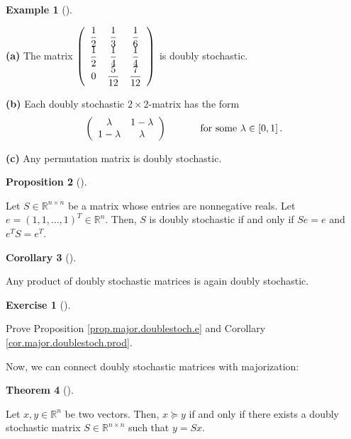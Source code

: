 \documentclass[numbers=enddot,12pt,final,onecolumn,notitlepage]{scrartcl}%
\newcounter{exer}
\numberwithin{exer}{subsection}
\theoremstyle{definition}
\newtheorem{theo}{Theorem}[subsection]
\newenvironment{theorem}[1][]
{\begin{theo}[#1]\begin{leftbar}}
{\end{leftbar}\end{theo}}
\newtheorem{prop}[theo]{Proposition}
\newenvironment{proposition}[1][]
{\begin{prop}[#1]\begin{leftbar}}
{\end{leftbar}\end{prop}}
\newtheorem{coro}[theo]{Corollary}
\newenvironment{corollary}[1][]
{\begin{coro}[#1]\begin{leftbar}}
{\end{leftbar}\end{coro}}
\newtheorem{exam}[theo]{Example}
\newenvironment{example}[1][]
{\begin{exam}[#1]\begin{leftbar}}
{\end{leftbar}\end{exam}}
\newtheorem{exmp}[exer]{Exercise}
\newenvironment{exercise}[1][]
{\begin{exmp}[#1]\begin{leftbar}}
{\end{leftbar}\end{exmp}}
\begin{document}
\begin{example}
\label{exa.major.doublestoch.exas}\textbf{(a)} The matrix $\left(
\begin{array}
[c]{ccc}%
\dfrac{1}{2} & \dfrac{1}{3} & \dfrac{1}{6}\\
\dfrac{1}{2} & \dfrac{1}{4} & \dfrac{1}{4}\\
0 & \dfrac{5}{12} & \dfrac{7}{12}%
\end{array}
\right)  $ is doubly stochastic. \medskip

\textbf{(b)} Each doubly stochastic $2\times2$-matrix has the form%
\[
\left(
\begin{array}
[c]{cc}%
\lambda & 1-\lambda\\
1-\lambda & \lambda
\end{array}
\right)  \ \ \ \ \ \ \ \ \ \ \text{for some }\lambda\in\left[  0,1\right]  .
\]


\textbf{(c)} Any permutation matrix is doubly stochastic.
\end{example}

\begin{proposition}
\label{prop.major.doublestoch.e}Let $S\in\mathbb{R}^{n\times n}$ be a matrix
whose entries are nonnegative reals. Let $e=\left(  1,1,\ldots,1\right)
^{T}\in\mathbb{R}^{n}$. Then, $S$ is doubly stochastic if and only if $Se=e$
and $e^{T}S=e^{T}$.
\end{proposition}

\begin{corollary}
\label{cor.major.doublestoch.prod}Any product of doubly stochastic matrices is
again doubly stochastic.
\end{corollary}

\begin{exercise}
 Prove Proposition \ref{prop.major.doublestoch.e} and Corollary
\ref{cor.major.doublestoch.prod}.
\end{exercise}

Now, we can connect doubly stochastic matrices with majorization:

\begin{theorem}
\label{thm.major.doublestoch.maj}Let $x,y\in\mathbb{R}^{n}$ be two vectors.
Then, $x\succcurlyeq y$ if and only if there exists a doubly stochastic matrix
$S\in\mathbb{R}^{n\times n}$ such that $y=Sx$.
\end{theorem}
\end{document}
